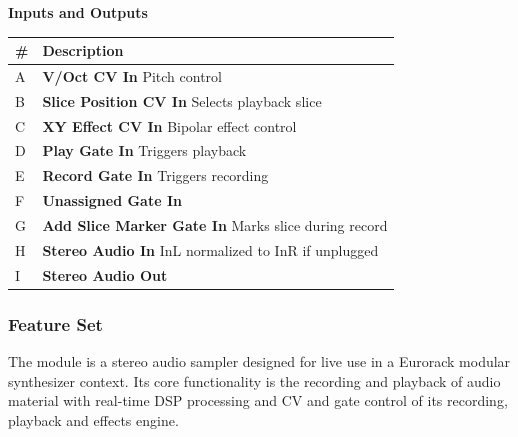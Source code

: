 \begin{table}[H]
\begin{minipage}[t]{0.48\textwidth}
\begin{tabular}{lp{5.5cm}}
            \bottomrule
        \end{tabular}
    \end{minipage}
    \hfill
    \begin{minipage}[t]{0.48\textwidth}
        \raggedright
        \textbf{Inputs and Outputs}\\[0.5em]
        \begin{tabular}{lp{5.5cm}}
            \toprule
            \textbf{\#} & \textbf{Description} \\
            \midrule
            A & \textbf{V/Oct CV In} \newline Pitch control \\
            B & \textbf{Slice Position CV In} \newline Selects playback slice \\
            C & \textbf{XY Effect CV In} \newline Bipolar effect control \\
            D & \textbf{Play Gate In} \newline Triggers playback \\
            E & \textbf{Record Gate In} \newline Triggers recording \\
            F & \textbf{Unassigned Gate In} \\
            G & \textbf{Add Slice Marker Gate In} \newline Marks slice during record \\
            H & \textbf{Stereo Audio In} \newline InL normalized to InR if unplugged \\
            I & \textbf{Stereo Audio Out} \\
            \bottomrule
        \end{tabular}
    \end{minipage}
\end{table}


\subsubsection{Feature Set}

The module is a stereo audio sampler designed for live use in a Eurorack modular synthesizer context. 
Its core functionality is the recording and playback of audio material with real-time DSP processing and CV and gate control of its recording, playback and effects engine.


